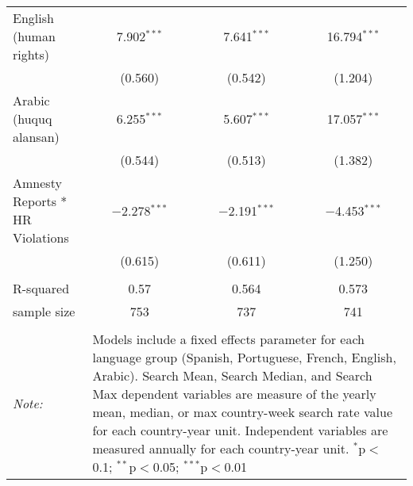 \begin{table}[!htbp]
\begin{tabular}{@{\extracolsep{5pt}}lccc}
  English (human rights) & 7.902$^{***}$ & 7.641$^{***}$ & 16.794$^{***}$ \\ 
  & (0.560) & (0.542) & (1.204) \\ 
  Arabic (huquq alansan) & 6.255$^{***}$ & 5.607$^{***}$ & 17.057$^{***}$ \\ 
  & (0.544) & (0.513) & (1.382) \\ 
  Amnesty Reports * HR Violations & $-$2.278$^{***}$ & $-$2.191$^{***}$ & $-$4.453$^{***}$ \\ 
  & (0.615) & (0.611) & (1.250) \\ 
 \hline \\[-1.8ex] 
R-squared  & 0.57 & 0.564 & 0.573 \\ 
sample size  & 753 & 737 & 741 \\ 
\hline 
\hline \\[-1.8ex] 
\textit{Note:}  & \multicolumn{3}{l}{\parbox[t]{8cm}{Models include a fixed effects parameter for each language group (Spanish, Portuguese, French, English, Arabic). Search Mean, Search Median, and Search Max dependent variables are measure of the yearly mean, median, or max country-week search rate value for each country-year unit. Independent variables are measured annually for each country-year unit. $^{*}$p$<$0.1; $^{**}$p$<$0.05; $^{***}$p$<$0.01}} \\ 
\end{tabular} 
\end{table} 
